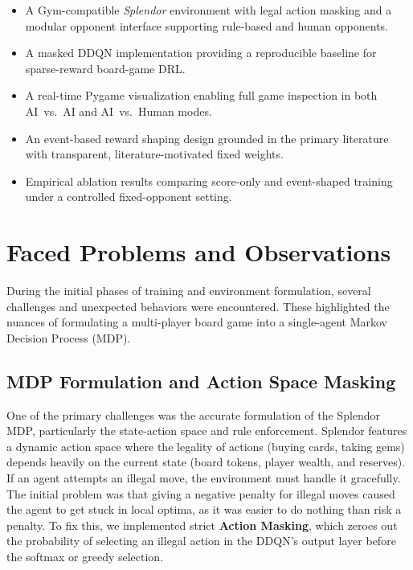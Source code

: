 \documentclass[11pt]{article}
\begin{document}
\begin{itemize}
  \item A Gym-compatible \textit{Splendor} environment with legal action masking and a
        modular opponent interface supporting rule-based and human opponents.
  \item A masked DDQN implementation providing a reproducible baseline for
        sparse-reward board-game DRL.
  \item A real-time Pygame visualization enabling full game inspection in both
        AI~vs.~AI and AI~vs.~Human modes.
  \item An event-based reward shaping design grounded in the primary literature with
        transparent, literature-motivated fixed weights.
  \item Empirical ablation results comparing score-only and event-shaped training
        under a controlled fixed-opponent setting.
\end{itemize}

\section{Faced Problems and Observations}
During the initial phases of training and environment formulation, several challenges and unexpected behaviors were encountered. These highlighted the nuances of formulating a multi-player board game into a single-agent Markov Decision Process (MDP).

\subsection{MDP Formulation and Action Space Masking}
One of the primary challenges was the accurate formulation of the Splendor MDP, particularly the state-action space and rule enforcement. Splendor features a dynamic action space where the legality of actions (buying cards, taking gems) depends heavily on the current state (board tokens, player wealth, and reserves). If an agent attempts an illegal move, the environment must handle it gracefully. The initial problem was that giving a negative penalty for illegal moves caused the agent to get stuck in local optima, as it was easier to do nothing than risk a penalty. To fix this, we implemented strict \textbf{Action Masking}, which zeroes out the probability of selecting an illegal action in the DDQN's output layer before the softmax or greedy selection. 
\end{document}
